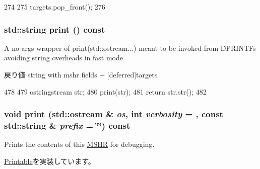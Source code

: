 \begin{DoxyCode}
274     {
275         targets.pop_front();
276     }
\end{DoxyCode}
\hypertarget{classMSHR_ae8a5b5e9e0e6be3b115ee77fa7b4d0c8}{
\subsubsection[{print}]{\setlength{\rightskip}{0pt plus 5cm}std::string print () const}}
\label{classMSHR_ae8a5b5e9e0e6be3b115ee77fa7b4d0c8}
A no-\/args wrapper of print(std::ostream...) meant to be invoked from DPRINTFs avoiding string overheads in fast mode

\begin{DoxyReturn}{戻り値}
string with mshr fields + \mbox{[}deferred\mbox{]}targets 
\end{DoxyReturn}



\begin{DoxyCode}
478 {
479     ostringstream str;
480     print(str);
481     return str.str();
482 }
\end{DoxyCode}
\hypertarget{classMSHR_ad5a464e147506af89ea2778d731fe46f}{
\subsubsection[{print}]{\setlength{\rightskip}{0pt plus 5cm}void print (std::ostream \& {\em os}, \/  int {\em verbosity} = {}, \/  const std::string \& {\em prefix} = {\ttfamily \char`\"{}\char`\"{}}) const}}
\label{classMSHR_ad5a464e147506af89ea2778d731fe46f}
Prints the contents of this \hyperlink{classMSHR}{MSHR} for debugging. 

\hyperlink{classPrintable_a3be2c5a60e9670becc3259fc689833c5}{Printable}を実装しています。


